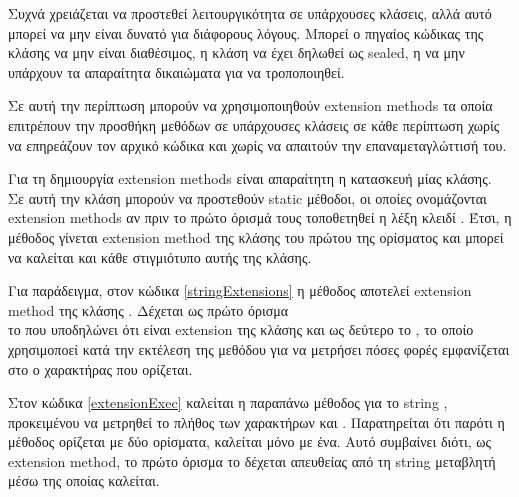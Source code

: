 Συχνά χρειάζεται να προστεθεί λειτουργικότητα σε υπάρχουσες κλάσεις, αλλά αυτό μπορεί να μην είναι δυνατό για διάφορους λόγους. Μπορεί ο πηγαίος κώδικας της κλάσης να μην είναι διαθέσιμος, η κλάση να έχει δηλωθεί ως sealed, η να μην υπάρχουν τα απαραίτητα δικαιώματα για να τροποποιηθεί.

Σε αυτή την περίπτωση μπορούν να χρησιμοποιηθούν extension methods τα οποία επιτρέπουν την προσθήκη μεθόδων σε υπάρχουσες κλάσεις σε κάθε περίπτωση χωρίς να επηρεάζουν τον αρχικό κώδικα και χωρίς να απαιτούν την επαναμεταγλώττισή του.

Για τη δημιουργία extension methods είναι απαραίτητη η κατασκευή μίας  κλάσης. Σε αυτή την κλάση μπορούν να προστεθούν static μέθοδοι, οι οποίες ονομάζονται extension methods αν πριν το πρώτο όρισμά τους τοποθετηθεί η λέξη κλειδί . Έτσι, η μέθοδος γίνεται extension method της κλάσης του πρώτου της ορίσματος και μπορεί να καλείται και κάθε στιγμιότυπο αυτής της κλάσης.

Για παράδειγμα, στον κώδικα \ref{stringExtensions} η μέθοδος  αποτελεί extension method της κλάσης . Δέχεται ως πρώτο όρισμα \\
 το  που υποδηλώνει ότι είναι extension της κλάσης  και ως δεύτερο το , το οποίο χρησιμοποεί κατά την εκτέλεση της μεθόδου για να μετρήσει πόσες φορές εμφανίζεται στο  ο χαρακτήρας που ορίζεται. 



Στον κώδικα \ref{extensionExec} καλείται η παραπάνω μέθοδος για το string , προκειμένου να μετρηθεί το πλήθος των χαρακτήρων  και . Παρατηρείται ότι παρότι η μέθοδος ορίζεται με δύο ορίσματα, καλείται μόνο με ένα. Αυτό συμβαίνει διότι, ως extension method, το πρώτο όρισμα το δέχεται απευθείας από τη string μεταβλητή μέσω της οποίας καλείται.


